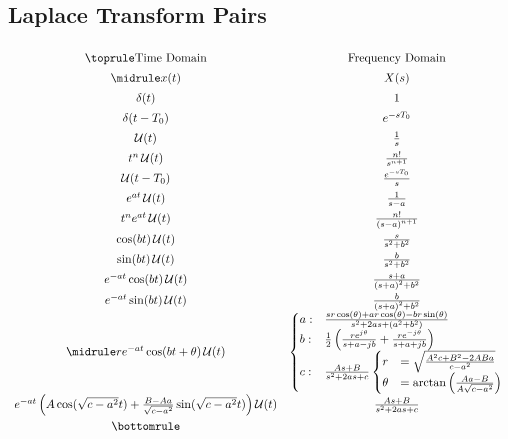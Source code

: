 \subsection{Laplace Transform Pairs}\label{subsec:Laplace_Transform_Pairs}
\begin{center}
  \begin{equation*}
    \renewcommand{\arraystretch}{1.4}
    \begin{array}[h!tbp]{cc}
      \toprule
      \text{Time Domain} & \text{Frequency Domain} \\
      \midrule
      x(t) & X(s) \\
      \delta(t) & 1 \\
      \delta(t-T_{0}) & e^{-sT_{0}} \\
      \UnitStep(t) & \frac{1}{s} \\
      t^{n} \UnitStep(t) & \frac{n!}{s^{n+1}} \\
      \UnitStep(t-T_{0}) & \frac{e^{-sT_{0}}}{s} \\
      e^{at} \UnitStep(t) & \frac{1}{s-a} \\
      t^{n} e^{at} \UnitStep(t) & \frac{n!}{{(s-a)}^{n+1}} \\
      \cos(bt) \UnitStep(t) & \frac{s}{s^{2} + b^{2}} \\
      \sin(bt) \UnitStep(t) & \frac{b}{s^{2} + b^{2}} \\
      e^{-at} \cos(bt) \UnitStep(t) & \frac{s+a}{{(s+a)}^{2} + b^{2}} \\
      e^{-at} \sin(bt) \UnitStep(t) & \frac{b}{{(s+a)}^{2} + b^{2}} \\
      \midrule
      r e^{-at} \cos(bt + \theta) \UnitStep(t) &
                                                 \begin{cases}
                                                   a :& \frac{sr \cos(\theta) + ar \cos(\theta) - br \sin(\theta)}{s^{2} + 2as + (a^{2} + b^{2})} \\
                                                   b :& \frac{1}{2} \left( \frac{r e^{j \theta}}{s+a-jb} + \frac{r e^{-j \theta}}{s+a+jb} \right) \\
                                                   c :& \frac{As+B}{s^{2} + 2as + c}
                                                   \begin{cases}
                                                     r &= \sqrt{\frac{A^{2}c + B^{2} - 2ABa}{c-a^{2}}} \\
                                                     \theta &= \arctan \left( \frac{Aa - B}{A \sqrt{c-a^{2}}} \right) \\
                                                   \end{cases}
                                                 \end{cases} \\
      e^{-at} \left( A \cos(\sqrt{c-a^{2}}t) + \frac{B-Aa}{\sqrt{c-a^{2}}} \sin(\sqrt{c-a^{2}}t) \right) \UnitStep(t) & \frac{As + B}{s^{2} + 2as + c} \\
      \bottomrule
    \end{array}
  \end{equation*}
\end{center}


